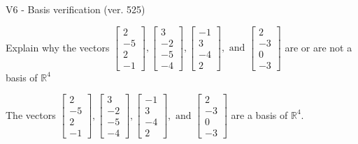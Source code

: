 \begin{exercise}
  \begin{exerciseTitle}V6 - Basis verification (ver. 525)\end{exerciseTitle}
  \begin{exerciseStatement}
    Explain why the vectors \(\left[\begin{array}{r}
2 \\
-5 \\
2 \\
-1
\end{array}\right] , \left[\begin{array}{r}
3 \\
-2 \\
-5 \\
-4
\end{array}\right] , \left[\begin{array}{r}
-1 \\
3 \\
-4 \\
2
\end{array}\right] , \text{ and } \left[\begin{array}{r}
2 \\
-3 \\
0 \\
-3
\end{array}\right]\) are or are not a basis of \(\mathbb{R}^4\)	


  \end{exerciseStatement}
  \begin{exerciseAnswer}
   The vectors \(\left[\begin{array}{r}
2 \\
-5 \\
2 \\
-1
\end{array}\right] , \left[\begin{array}{r}
3 \\
-2 \\
-5 \\
-4
\end{array}\right] , \left[\begin{array}{r}
-1 \\
3 \\
-4 \\
2
\end{array}\right] , \text{ and } \left[\begin{array}{r}
2 \\
-3 \\
0 \\
-3
\end{array}\right]\) 
  	 are  a basis of \(\mathbb{R}^4\).
  


  \end{exerciseAnswer}
\end{exercise}